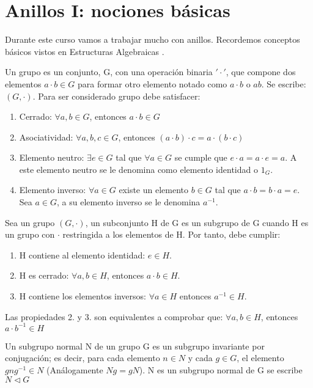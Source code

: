 \chapter{Anillos I: nociones básicas}

Durante este curso vamos a trabajar mucho con anillos. Recordemos conceptos básicos vistos en Estructuras Algebraicas \cite{apuntesEA}.


\begin{defn}[Grupo]
Un grupo es un conjunto, G, con una operación binaria $'\cdot'$, que compone dos elementos $a \cdot b \in G$ para formar otro elemento notado como $a \cdot b$ o $ab$. Se escribe: $(G,\cdot)$. Para ser considerado grupo debe satisfacer:
\begin{enumerate}
	\item Cerrado: $\forall a,b \in G$, entonces $a \cdot b \in G$
	\item Asociatividad: $\forall a,b,c \in G$, entonces $(a\cdot b) \cdot c = a \cdot (b \cdot c)$
	\item Elemento neutro: $\exists e \in G$ tal que $\forall a \in G$ se cumple que $e\cdot a=a\cdot e = a$. A este elemento neutro se le denomina como elemento identidad o $1_G$.
	\item Elemento inverso: $\forall a \in G$ existe un elemento $b \in G$ tal que $a \cdot b = b \cdot a = e$. Sea $a \in G$, a su elemento inverso se le denomina $a^{-1}$.
\end{enumerate}
\end{defn}

\begin{defn}[Subgrupo]
Sea un grupo  $(G,\cdot)$, un subconjunto H de G es un subgrupo de G cuando H es un grupo con $\cdot$ restringida a los elementos de H. Por tanto, debe cumplir:
\begin{enumerate}
	\item H contiene al elemento identidad: $e \in H$.
	\item H es cerrado: $\forall a,b \in H$, entonces $a \cdot b \in H$.
	\item H contiene los elementos inversos: $\forall a \in H$ entonces $a^{-1} \in H$.
\end{enumerate}
\obs Las propiedades 2. y 3. son equivalentes a comprobar que: $\forall a,b \in H$, entonces $a \cdot b^{-1}  \in H$
\end{defn}

\begin{defn}
	Un subgrupo normal N de un grupo G es un subgrupo invariante por conjugación; es decir, para cada elemento $n \in N$ y cada $g \in G$, el elemento $gng^{-1} \in N$ (Análogamente $Ng = gN$). N es un subgrupo normal de G se escribe $N \triangleleft G$
\end{defn}

